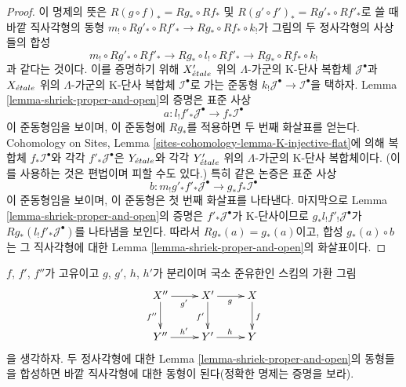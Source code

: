 \begin{proof}
이 명제의 뜻은
$R(g \circ f)_* = Rg_* \circ Rf_*$ 및
$R(g' \circ f')_* = Rg'_* \circ Rf'_*$로 쓸 때 바깥 직사각형의 동형
$m_! \circ Rg'_* \circ Rf'_* \to Rg_* \circ Rf_* \circ k_!$가
그림의 두 정사각형의 사상들의 합성
$$
m_! \circ Rg'_* \circ Rf'_* \to
Rg_* \circ l_! \circ Rf'_* \to
Rg_* \circ Rf_* \circ k_!
$$
과 같다는 것이다. 이를 증명하기 위해 $X'_{\acute{e}tale}$ 위의
$\Lambda$-가군의 K-단사 복합체 $\mathcal{J}^\bullet$과
$X_{\acute{e}tale}$ 위의 $\Lambda$-가군의 K-단사 복합체
$\mathcal{I}^\bullet$로 가는 준동형
$k_!\mathcal{J}^\bullet \to \mathcal{I}^\bullet$을 택하자.
Lemma \ref{lemma-shriek-proper-and-open}의 증명은 표준 사상
$$
a : l_!f'_*\mathcal{J}^\bullet \to f_*\mathcal{I}^\bullet
$$
이 준동형임을 보이며, 이 준동형에 $Rg_*$를 적용하면 두 번째
화살표를 얻는다. Cohomology on Sites, Lemma
\ref{sites-cohomology-lemma-K-injective-flat}에 의해 복합체
$f_*\mathcal{I}^\bullet$와 각각 $f'_*\mathcal{J}^\bullet$은
$Y_{\acute{e}tale}$와 각각 $Y'_{\acute{e}tale}$ 위의 $\Lambda$-가군의 K-단사
복합체이다. (이를 사용하는 것은 편법이며 피할 수도 있다.) 특히 같은
논증은 표준 사상
$$
b : m_!g'_*f'_*\mathcal{J}^\bullet \to g_*f_*\mathcal{I}^\bullet
$$
이 준동형임을 보이며, 이 준동형은 첫 번째 화살표를 나타낸다.
마지막으로 Lemma \ref{lemma-shriek-proper-and-open}의 증명은
$f'_*\mathcal{J}^\bullet$가 K-단사이므로
$g_*l_!f'_!\mathcal{J}^\bullet$가
$Rg_*(l_!f'_*\mathcal{J}^\bullet)$를 나타냄을 보인다. 따라서
$Rg_*(a) = g_*(a)$이고, 합성 $g_*(a) \circ b$는 그 직사각형에 대한
Lemma \ref{lemma-shriek-proper-and-open}의 화살표이다.
\end{proof}

\begin{lemma}
\label{lemma-shriek-proper-and-open-compose-horizontal}
$f$, $f'$, $f''$가 고유이고 $g$, $g'$, $h$, $h'$가 분리이며 국소
준유한인 스킴의 가환 그림
$$
\xymatrix{
X'' \ar[r]_{g'} \ar[d]_{f''} &
X' \ar[r]_g \ar[d]_{f'} &
X \ar[d]^f \\
Y'' \ar[r]^{h'} &
Y' \ar[r]^h &
Y
}
$$
을 생각하자. 두 정사각형에 대한 Lemma
\ref{lemma-shriek-proper-and-open}의 동형들을 합성하면 바깥
직사각형에 대한 동형이 된다(정확한 명제는 증명을 보라).
\end{lemma}

